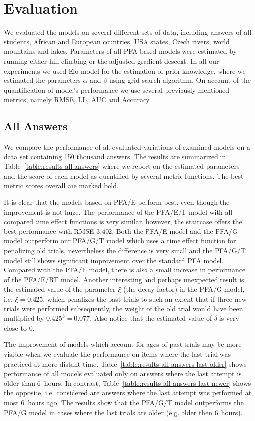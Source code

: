 \section{Evaluation}
\label{evaluation}

We evaluated the models on several different sets of data, including answers of all students, African and European countries, USA states, Czech rivers, world mountains and lakes. Parameters of all PFA-based models were estimated by running either hill climbing or the adjusted gradient descent. In all our experiments we used Elo model for the estimation of prior knowledge, where we estimated the parameters $\alpha$ and $\beta$ using grid search algorithm. On account of the quantification of model's performance we use several previously mentioned metrics, namely RMSE, LL, AUC and Accuracy.

\subsection{All Answers}

We compare the performance of all evaluated variations of examined models on a data set containing 150 thousand answers. The results are summarized in Table~\ref{table:results-all-answers} where we report on the estimated parameters and the score of each model as quantified by several metric functions. The best metric scores overall are marked bold.

It is clear that the models based on PFA/E perform best, even though the improvement is not huge. The performance of the PFA/E/T model with all compared time effect functions is very similar, however, the staircase offers the best performance with RMSE $3.402$. Both the PFA/E model and the PFA/G model outperform our PFA/G/T model which uses a time effect function for penalizing old trials, nevertheless the difference is very small and the PFA/G/T model still shows significant improvement over the standard PFA model. Compared with the PFA/E model, there is also a small increase in performance of the PFA/E/RT model. Another interesting and perhaps unexpected result is the estimated value of the parameter $\xi$ (the decay factor) in the PFA/G model, i.e. $\xi = 0.425$, which penalizes the past trials to such an extent that if three new trials were performed subsequently, the weight of the old trial would have been multiplied by $0.425^3 = 0.077$. Also notice that the estimated value of $\delta$ is very close to $0$.

The improvement of models which account for ages of past trials may be more visible when we evaluate the performance on items where the last trial was practiced at more distant time. Table~\ref{table:results-all-answers-last-older} shows performance of all models evaluated only on answers where the last attempt is older than 6~hours. In contrast, Table~\ref{table:results-all-answers-last-newer} shows the opposite, i.e. considered are answers where the last attempt was performed at most 6~hours ago. The results show that the PFA/G/T model outperforms the PFA/G model in cases where the last trials are older (e.g. older then 6~hours).

